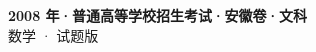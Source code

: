 \documentclass[zihao=-4, a4paper]{ctexart}
\begin{document}
\begin{center}
  {\Large\bfseries 2008 年·普通高等学校招生考试·安徽卷·文科}\\[4pt]
  {\large 数学 · 试题版}
\end{center}
\medskip
{}

\end{document}
